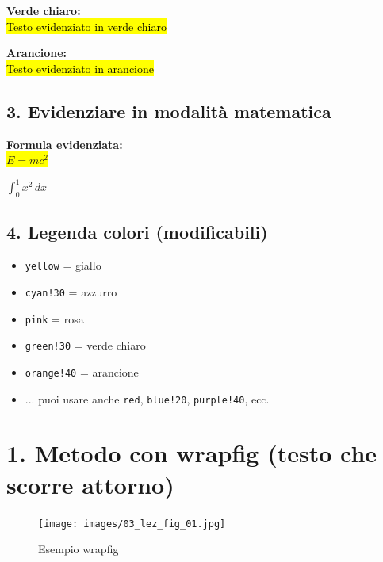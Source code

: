 \documentclass[12pt]{book}
\begin{document}
\vspace{5pt}
\textbf{Verde chiaro:}\\
{\hl{Testo evidenziato in verde chiaro}}

\vspace{5pt}
\textbf{Arancione:}\\
{\hl{Testo evidenziato in arancione}}

\subsection*{3. Evidenziare in modalità matematica}

\textbf{Formula evidenziata:}\\
\colorbox{yellow}{$E = mc^2$}

\vspace{5pt}
\colorbox{cyan!30}{$\int_0^1 x^2\,dx$}

\subsection*{4. Legenda colori (modificabili)}

\begin{itemize}
  \item \texttt{yellow} = giallo
  \item \texttt{cyan!30} = azzurro
  \item \texttt{pink} = rosa
  \item \texttt{green!30} = verde chiaro
  \item \texttt{orange!40} = arancione
  \item ... puoi usare anche \texttt{red}, \texttt{blue!20}, \texttt{purple!40}, ecc.

  
\end{itemize}

\newpage

\section*{1. Metodo con wrapfig (testo che scorre attorno)}
\begin{figure}
  \centering
  \texttt{[image: images/03\_lez\_fig\_01.jpg]}
  \caption{Esempio wrapfig}
\end{figure}
\lipsum[1-2] %

\newpage
\end{document}
